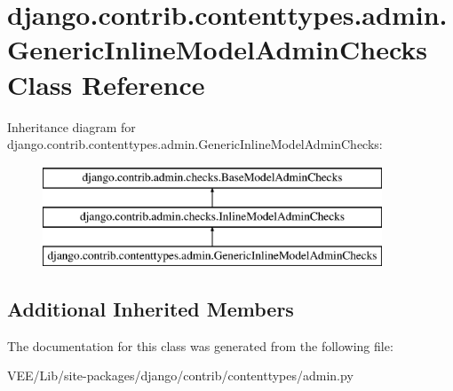 \hypertarget{classdjango_1_1contrib_1_1contenttypes_1_1admin_1_1_generic_inline_model_admin_checks}{}\section{django.\+contrib.\+contenttypes.\+admin.\+Generic\+Inline\+Model\+Admin\+Checks Class Reference}
\label{classdjango_1_1contrib_1_1contenttypes_1_1admin_1_1_generic_inline_model_admin_checks}
Inheritance diagram for django.\+contrib.\+contenttypes.\+admin.\+Generic\+Inline\+Model\+Admin\+Checks\+:\begin{figure}[H]
\begin{center}
\leavevmode
\includegraphics[height=3.000000cm]{classdjango_1_1contrib_1_1contenttypes_1_1admin_1_1_generic_inline_model_admin_checks}
\end{center}
\end{figure}
\subsection*{Additional Inherited Members}


The documentation for this class was generated from the following file\+:\begin{DoxyCompactItemize}
\item 
V\+E\+E/\+Lib/site-\/packages/django/contrib/contenttypes/admin.\+py\end{DoxyCompactItemize}
